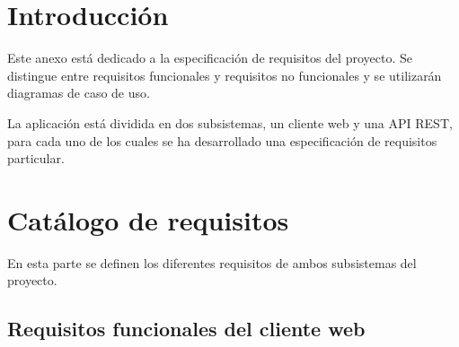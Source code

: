 
\section{Introducción}

Este anexo está dedicado a la especificación de requisitos del proyecto. Se distingue entre requisitos funcionales y requisitos no funcionales y se utilizarán diagramas de caso de uso.

La aplicación está dividida en dos subsistemas, un cliente web y una API REST, para cada uno de los cuales se ha desarrollado una especificación de requisitos particular.

\section{Catálogo de requisitos}

En esta parte se definen los diferentes requisitos de ambos subsistemas del proyecto.

\subsection{Requisitos funcionales del cliente web}


